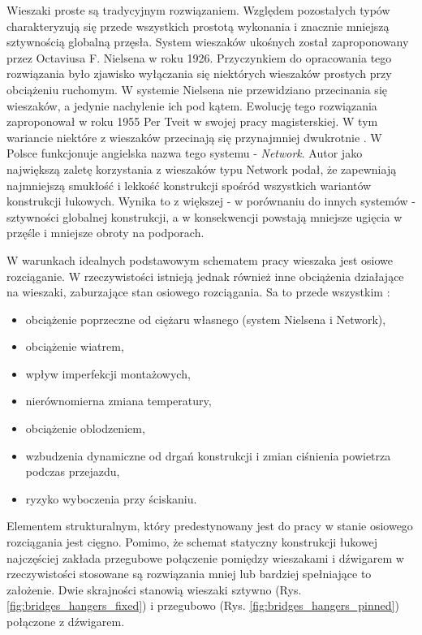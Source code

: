 Wieszaki proste są tradycyjnym rozwiązaniem. Względem pozostałych typów charakteryzują się przede wszystkich prostotą wykonania i znacznie mniejszą sztywnością globalną przęsła. System wieszaków ukośnych został zaproponowany przez Octaviusa F. Nielsena w roku 1926. Przyczynkiem do opracowania tego rozwiązania było zjawisko wyłączania się niektórych wieszaków prostych przy obciążeniu ruchomym. W systemie Nielsena nie przewidziano przecinania się wieszaków, a jedynie nachylenie ich pod kątem. Ewolucję tego rozwiązania zaproponował w roku 1955 Per Tveit w swojej pracy magisterskiej. W tym wariancie niektóre z wieszaków przecinają się przynajmniej dwukrotnie \parencite{Tveit2019}. W Polsce funkcjonuje angielska nazwa tego systemu - \textit{Network}. Autor \cite{Tveit2019} jako największą zaletę korzystania z wieszaków typu Network podał, że zapewniają najmniejszą smukłość i lekkość konstrukcji spośród wszystkich wariantów konstrukcji łukowych. Wynika to z większej - w porównaniu do innych systemów - sztywności globalnej konstrukcji, a w konsekwencji powstają mniejsze ugięcia w przęśle i mniejsze obroty na podporach.

W warunkach idealnych podstawowym schematem pracy wieszaka jest osiowe rozciąganie. W rzeczywistości istnieją jednak również inne obciążenia działające na wieszaki, zaburzające stan osiowego rozciągania. Sa to przede wszystkim \parencite{Zobel2015}:
\begin{itemize}
	\item obciążenie poprzeczne od ciężaru własnego (system Nielsena i Network),
	\item obciążenie wiatrem,
	\item wpływ imperfekcji montażowych,
	\item nierównomierna zmiana temperatury,
	\item obciążenie oblodzeniem,
	\item wzbudzenia dynamiczne od drgań konstrukcji i zmian ciśnienia powietrza podczas przejazdu,
	\item ryzyko wyboczenia przy ściskaniu.
\end{itemize}

Elementem strukturalnym, który predestynowany jest do pracy w stanie osiowego rozciągania jest cięgno. Pomimo, że schemat statyczny konstrukcji łukowej najczęściej zakłada przegubowe połączenie pomiędzy wieszakami i dźwigarem w rzeczywistości stosowane są rozwiązania mniej lub bardziej spełniające to założenie. Dwie skrajności stanowią wieszaki sztywno (Rys. \ref{fig:bridges_hangers_fixed}) i przegubowo (Rys. \ref{fig:bridges_hangers_pinned}) połączone z dźwigarem. 

